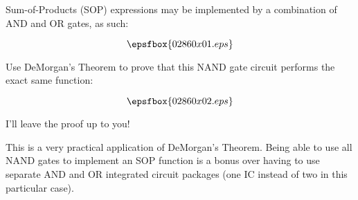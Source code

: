 

Sum-of-Products (SOP) expressions may be implemented by a combination of AND and OR gates, as such:

$$\epsfbox{02860x01.eps}$$

Use DeMorgan's Theorem to prove that this NAND gate circuit performs the exact same function:

$$\epsfbox{02860x02.eps}$$







I'll leave the proof up to you!







This is a very practical application of DeMorgan's Theorem.  Being able to use all NAND gates to implement an SOP function is a bonus over having to use separate AND and OR integrated circuit packages (one IC instead of two in this particular case).




